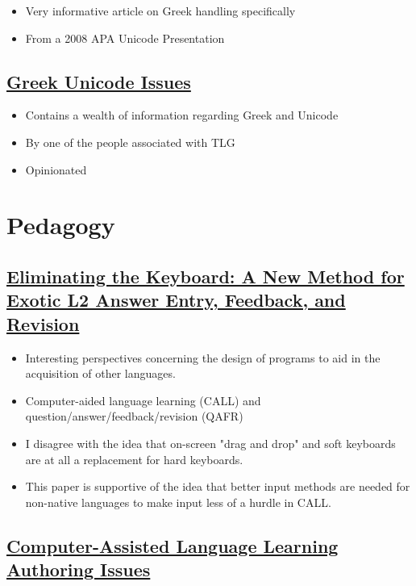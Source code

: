 \documentclass[11pt]{article}
\begin{document}
\begin{itemize}
\item Very informative article on Greek handling specifically
\item From a 2008 APA Unicode Presentation
\end{itemize}

\subsection{\href{http://www.opoudjis.net/unicode/unicode.html}{Greek Unicode Issues}}
\label{sec:org4e2fca7}

\begin{itemize}
\item Contains a wealth of information regarding Greek and Unicode
\item By one of the people associated with TLG
\item Opinionated
\end{itemize}

\section{Pedagogy}
\label{sec:orgc82a124}

\subsection{\href{https://www.jstor.org/stable/24147886}{Eliminating the Keyboard: A New Method for Exotic L2 Answer Entry, Feedback, and Revision}}
\label{sec:orgfb2ea59}

\begin{itemize}
\item Interesting perspectives concerning the design of programs to aid in the acquisition of other languages.
\item Computer-aided language learning (CALL) and question/answer/feedback/revision (QAFR)
\item I disagree with the idea that on-screen "drag and drop" and soft keyboards are at all a replacement for hard keyboards.
\item This paper is supportive of the idea that better input methods are needed for non-native languages to make input less of a hurdle in CALL.
\end{itemize}

\subsection{\href{https://www.jstor.org/stable/25612275}{Computer-Assisted Language Learning Authoring Issues}}
\label{sec:orgbd40709}
\end{document}
